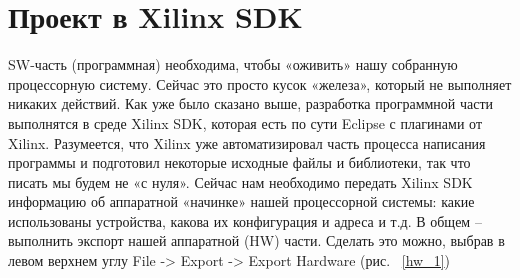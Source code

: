 \documentclass[a4paper,oneside ,14pt]{extreport}
\begin{document}
\section{Проект в Xilinx SDK}

SW-часть (программная) необходима, чтобы «оживить» нашу собранную 
процессорную систему. Сейчас это просто кусок «железа», который не выполняет 
никаких действий. Как уже было сказано выше, разработка программной части 
выполнятся в среде Xilinx SDK, которая есть по сути Eclipse с плагинами от Xilinx. 
Разумеется, что Xilinx уже автоматизировал часть процесса написания программы и 
подготовил некоторые исходные файлы и библиотеки, так что писать мы будем не 
«с нуля». Сейчас нам необходимо передать Xilinx SDK информацию об аппаратной 
«начинке» нашей процессорной системы: какие использованы устройства, какова их 
конфигурация и адреса и т.д. В общем – выполнить экспорт нашей аппаратной (HW) 
части. Сделать это можно, выбрав в левом верхнем углу File -> Export -> Export Hardware
(рис. ~\ref{hw_1})
\end{document}
